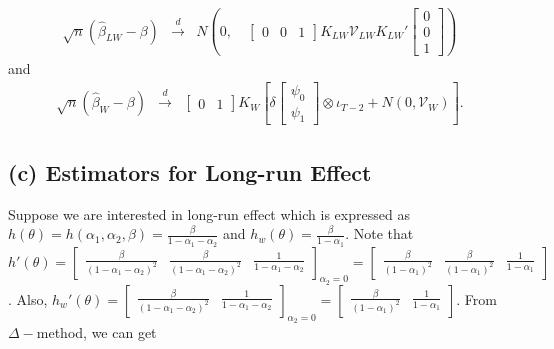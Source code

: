 	\begin{eqnarray}
 			\sqrt{n} (\widehat{\beta}_{LW}-\beta) &\overset{d}{\rightarrow}& N\left(0,\quad \left[\begin{array}{ccc} 0& 0& 
1 \end{array}\right] K_{LW}\mathcal{V}_{LW} K_{LW}' \left[\begin{array}{l} 0\\ 0\\ 
1 \end{array}\right]  \right)
	\end{eqnarray}
and
\begin{eqnarray}
 	\sqrt{n}(\widehat{\beta}_{W}-\beta) &\overset{d}{\rightarrow}&\left[\begin{array}{cc} 0& 1 \end{array}\right]
 	K_W  \left[\delta \left[\begin{array}{l} \psi_0\\ 
\psi_1 \end{array}\right]  \otimes \iota_{T-2} + N\left(0, \mathcal{V}_W\right) \right].
	\end{eqnarray}
	
	
\subsection*{(c) Estimators for Long-run Effect}
\vspace{0.1in}

	Suppose we are interested in long-run effect which is expressed as $h(\theta) = h(\alpha_1, \alpha_2, \beta) = \frac{\beta}{1-\alpha_1-\alpha_2}$ and $h_w(\theta) = \frac{\beta}{1-\alpha_1}$. Note that $h'(\theta) = \left[\begin{array}{ccc} \frac{\beta}{(1-\alpha_1-\alpha_2)^2}& \frac{\beta}{(1-\alpha_1-\alpha_2)^2} & \frac{1}{1-\alpha_1-\alpha_2}\end{array}\right]_{\alpha_2=0} =\left[\begin{array}{ccc} \frac{\beta}{(1-\alpha_1)^2}& \frac{\beta}{(1-\alpha_1)^2} & \frac{1}{1-\alpha_1}\end{array}\right] $. Also, $h_w'(\theta) = \left[\begin{array}{ccc} \frac{\beta}{(1-\alpha_1-\alpha_2)^2}& \frac{1}{1-\alpha_1-\alpha_2}\end{array}\right]_{\alpha_2=0} =\left[\begin{array}{ccc} \frac{\beta}{(1-\alpha_1)^2}& \frac{1}{1-\alpha_1}\end{array}\right] $. From $\Delta-$method, we can get
	
